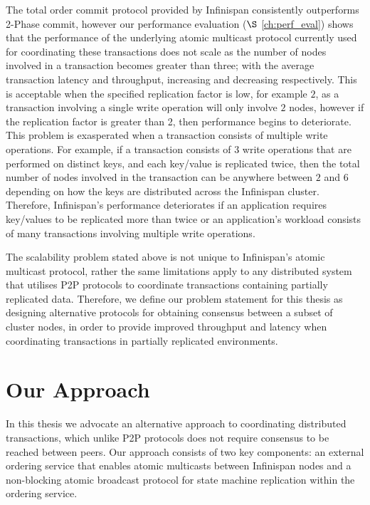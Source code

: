     The total order commit protocol provided by Infinispan consistently outperforms 2-Phase commit, however our performance evaluation ($\S$ \ref{ch:perf_eval}) shows that the performance of the underlying atomic multicast protocol currently used for coordinating these transactions does not scale as the number of nodes involved in a transaction becomes greater than three; with the average transaction latency and throughput, increasing and decreasing respectively.  This is acceptable when the specified replication factor is low, for example $2$, as a transaction involving a single write operation will only involve $2$ nodes, however if the replication factor is greater than 2, then performance begins to deteriorate.  This problem is exasperated when a transaction consists of multiple write operations.  For example, if a transaction consists of  $3$ write operations that are performed on distinct keys, and each key/value is replicated twice, then the total number of nodes involved in the transaction can be anywhere between $2$ and $6$ depending on how the keys are distributed across the Infinispan cluster.  Therefore, Infinispan's performance deteriorates if an application requires key/values to be replicated more than twice or an application's workload consists of many transactions involving multiple write operations.  
    
    The scalability problem stated above is not unique to Infinispan's atomic multicast protocol, rather the same limitations apply to any distributed system that utilises P2P protocols to coordinate transactions containing partially replicated data.  Therefore, we define our problem statement for this thesis as designing alternative protocols for obtaining consensus between a subset of cluster nodes, in order to provide improved throughput and latency when coordinating transactions in partially replicated environments.  
    
    \section{Our Approach}    
    In this thesis we advocate an alternative approach to coordinating distributed transactions, which unlike P2P protocols does not require consensus to be reached between peers.  Our approach consists of two key components: an external ordering service that enables atomic multicasts between Infinispan nodes and a non-blocking atomic broadcast protocol for state machine replication within the ordering service.  
   

